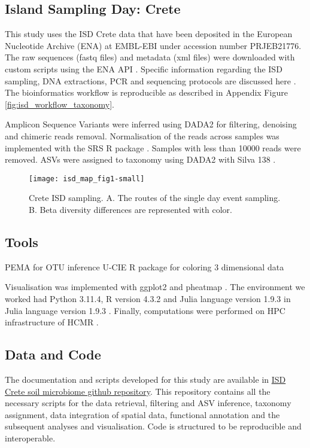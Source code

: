 \subsection{Island Sampling Day: Crete}\label{isd_data}

This study uses the ISD Crete data that have been deposited
in the European Nucleotide Archive (ENA) at EMBL-EBI under accession number PRJEB21776.
The raw sequences (fastq files) and metadata (xml files) were downloaded with custom scripts using the ENA API \parencite{Yuan2023}.
Specific information regarding the ISD sampling, DNA extractions, PCR and sequencing
protocols are discussed here \parencite{holm2024}. The bioinformatics workflow is 
reproducible as described in Appendix Figure \ref{fig:isd_workflow_taxonomy}.

Amplicon Sequence Variants were inferred using DADA2 \parencite{Callahan2016} for 
filtering, denoising and chimeric reads removal. Normalisation of the reads
across samples was implemented with the SRS R package \parencite{Beule2020}. Samples
with less than 10000 reads were removed. ASVs were assigned to taxonomy using 
DADA2 with Silva 138 \parencite{quast_silva_2013}.


\begin{figure}[h] 
    \centering\texttt{[image: isd\_map\_fig1-small]}
    \caption{Crete ISD sampling. A. The routes of the single day event sampling. B. Beta diversity differences are represented with color.}
    \label{fig:isd_crete_sampling}
\end{figure}


\subsection{Tools}\label{Coding environment}
PEMA for OTU inference \parencite{zafeiropoulos2020pema}
U-CIE R package for coloring 3 dimensional data \parencite{Koutrouli2022}

Visualisation was implemented with ggplot2 \parencite{wickham_ggplot2_2016} and pheatmap \parencite{Kolde2019}.
The environment we worked had Python 3.11.4, R version 4.3.2 \parencite{rcoreteam}
and Julia language version 1.9.3 \parencite{Julia-2017}in Julia language version 1.9.3 \parencite{Julia-2017}.
Finally, computations were performed on HPC infrastructure of HCMR \parencite{zafeiropoulos_0s_2021}.

\subsection{Data and Code}
The documentation and scripts developed for this study are available in
\href{https://github.com/GenomicsStandardsConsortium/ISD}{ISD Crete soil microbiome github repository}.
This repository contains all the necessary scripts for the data retrieval,
filtering and ASV inference, taxonomy assignment, data integration of spatial data, 
functional annotation and the subsequent analyses and visualisation.
Code is structured to be reproducible and interoperable.

